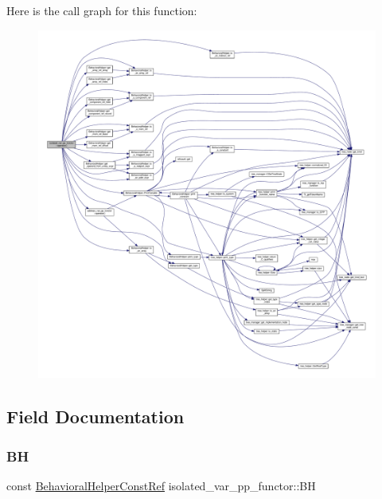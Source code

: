 Here is the call graph for this function\+:
\nopagebreak
\begin{figure}[H]
\begin{center}
\leavevmode
\includegraphics[width=350pt]{dc/d5b/structisolated__var__pp__functor_a2597699d66d8b51c9faa06d0be2e1f43_cgraph}
\end{center}
\end{figure}


\subsection{Field Documentation}
\mbox{\label{structisolated__var__pp__functor_ad53cd26c4a886ded9d6fb5b399db35d6}} 
\subsubsection{\texorpdfstring{BH}{BH}}
{\footnotesize\ttfamily const \hyperlink{behavioral__helper_8hpp_aae973b54cac87eef3b27442aa3e1e425}{Behavioral\+Helper\+Const\+Ref} isolated\+\_\+var\+\_\+pp\+\_\+functor\+::\+BH\hspace{0.3cm}{\ttfamily [private]}}



